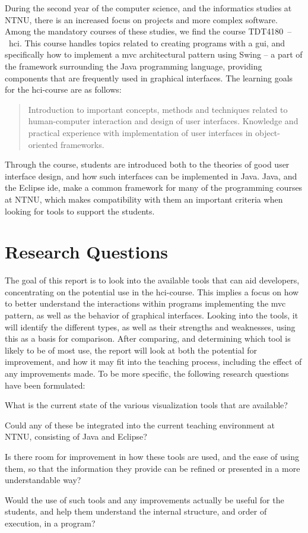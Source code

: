 During the second year of the computer science, and the informatics studies at NTNU, there is an increased focus on projects and more complex software.
Among the mandatory courses of these studies, we find the course TDT4180~--~\gls{hci}.
This course handles topics related to creating programs with a \gls{gui}, and specifically how to implement a \gls{mvc} architectural pattern using Swing -- a part of the framework surrounding the Java programming language, providing components that are frequently used in graphical interfaces.
The learning goals for the \gls{hci}-course are as follows:
\begin{quote}
Introduction to important concepts, methods and techniques related to human-computer interaction and design of user interfaces.
Knowledge and practical experience with implementation of user interfaces in object-oriented frameworks.
\end{quote}
Through the course, students are introduced both to the theories of good user interface design, and how such interfaces can be implemented in Java.
Java, and the Eclipse \gls{ide}, make a common framework for many of the programming courses at NTNU, which makes compatibility with them an important criteria when looking for tools to support the students.

\section{Research Questions}\label{intro-RQs}

The goal of this report is to look into the available tools that can aid developers, concentrating on the potential use in the \gls{hci}-course.
This implies a focus on how to better understand the interactions within programs implementing the \gls{mvc} pattern, as well as the behavior of graphical interfaces.
Looking into the tools, it will identify the different types, as well as their strengths and weaknesses, using this as a basis for comparison.
After comparing, and determining which tool is likely to be of most use, the report will look at both the potential for improvement, and how it may fit into the teaching process, including the effect of any improvements made.
To be more specific, the following research questions have been formulated:
\begin{theorem}
What is the current state of the various visualization tools that are available?
\end{theorem}
\begin{theorem}
Could any of these be integrated into the current teaching environment at NTNU, consisting of Java and Eclipse? %
\end{theorem}
\begin{theorem}
Is there room for improvement in how these tools are used, and the ease of using them, so that the information they provide can be refined or presented in a more understandable way? %
\end{theorem}
\begin{theorem}
Would the use of such tools and any improvements actually be useful for the students, and help them understand the internal structure, and order of execution, in a program?%
\end{theorem}
